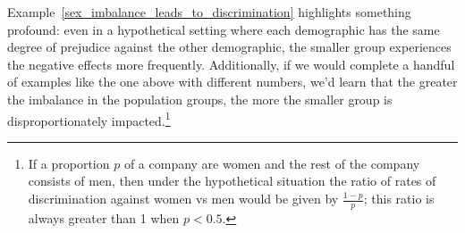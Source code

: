 Example~\ref{sex_imbalance_leads_to_discrimination}
highlights something profound:
even in a hypothetical setting where each demographic
has the same degree of prejudice
against the other demographic, the smaller group
experiences the negative effects more frequently.
Additionally, if we would complete a handful of examples
like the one above with different numbers,
we'd learn that the greater the imbalance
in the population groups, the more the smaller group
is disproportionately impacted.\footnote{%
  If a proportion $p$ of a company are
  women and the rest of the company consists of men,
  then under the hypothetical situation
  the ratio of rates of discrimination against women
  vs men would be given by $\frac{1 - p}{p}$;
  this ratio is always greater than 1 when $p < 0.5$.}%

